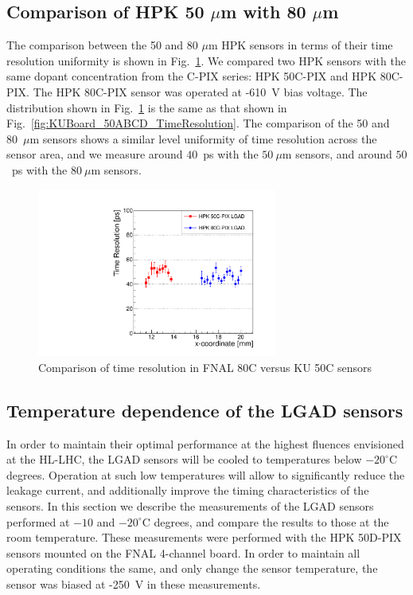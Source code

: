 \documentclass[preprint,1p]{elsarticle}
\begin{document}
\subsection{Comparison of HPK 50 $\mu$m with 80 $\mu$m}
\label{sec:HPK50vs80}

The comparison between the 50 and 80 $\mu$m HPK sensors in terms of their time
resolution uniformity is shown in Fig.~\ref{fig:HPK50CVs80C}. We compared two
HPK sensors with the same dopant concentration from the C-PIX series: HPK
50C-PIX and HPK 80C-PIX. The HPK 80C-PIX sensor was operated at -610~V bias
voltage. The distribution shown in Fig.~\ref{fig:HPK50CVs80C} is the same as
that shown in Fig.~\ref{fig:KUBoard_50ABCD_TimeResolution}. The comparison of
the 50 and 80~$\mu$m sensors shows a similar level uniformity of time resolution
across the sensor area, and we measure around $40$~ps with the $50~\mu$m
sensors, and around $50$~ps with the $80~\mu$m sensors.

\begin{figure}[htbp] 
\centering
\includegraphics[width=0.7\textwidth]{figs/FNAL_TimeResolution_vs_X_HPK50CVs80C.pdf} 
\caption{Comparison of time resolution in FNAL 80C versus KU 50C sensors } 
\label{fig:HPK50CVs80C} 
\end{figure} 


\subsection{Temperature dependence of the LGAD sensors}
\label{sec:temp_dependance}

In order to maintain their optimal performance at the highest fluences
envisioned at the HL-LHC, the LGAD sensors will be cooled to temperatures below
$-20^{\circ}$C degrees. Operation at such low temperatures will allow to
significantly reduce the leakage current, and additionally improve the timing
characteristics of the sensors. In this section we describe the measurements of
the LGAD sensors performed at $-10$ and $-20^{\circ}$C degrees, and compare the
results to those at the room temperature. These measurements were performed with
the HPK 50D-PIX sensors mounted on the FNAL 4-channel board. In order to
maintain all operating conditions the same, and only change the sensor
temperature, the sensor was biased at -250~V in these measurements. 
\end{document}

